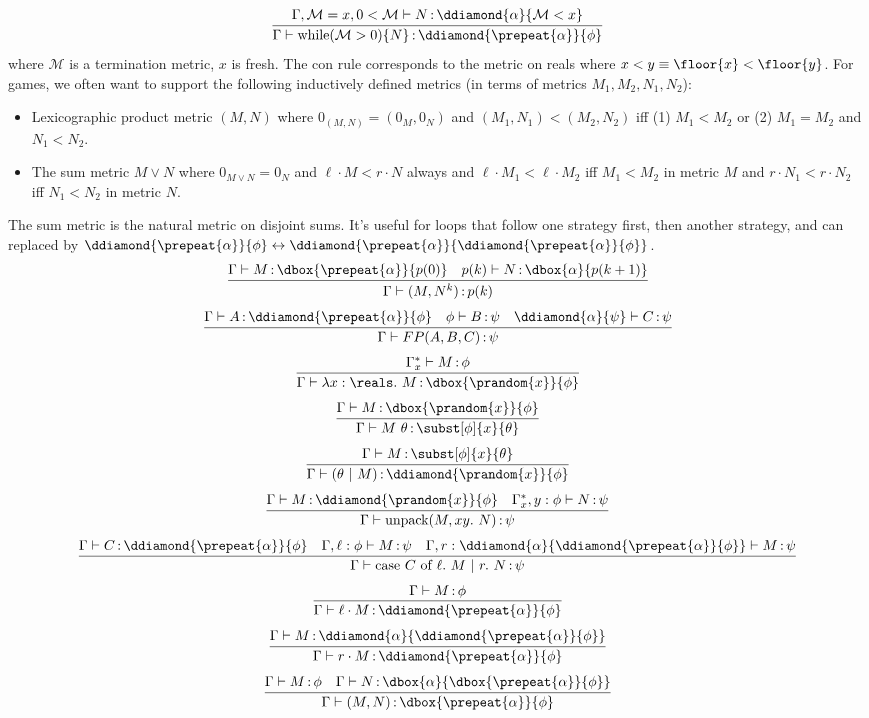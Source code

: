\documentclass[12pt]{cmuthesis}
\theoremstyle{definition}
\theoremstyle{remark}
\newcommand{\lequiv}{\leftrightarrow}
\begin{document}
\[\infer{\proves{\G}{\ewhile{\mathcal{M}}{N}}{\ddiamond{\prepeat{\alpha}}{\phi}}}
        {\proves{\G,\mathcal{M}=x,0<\mathcal{M}}{N}{\ddiamond{\alpha}{\mathcal{M}<x}}}\]
where $\mathcal{M}$ is a termination metric, $x$ is fresh.
The con rule corresponds to the metric on reals where $x < y \equiv \floor{x} < \floor{y}$.
For games, we often want to support the following inductively defined metrics (in terms of metrics $M_1, M_2, N_1, N_2$):
\begin{itemize}
\item Lexicographic product metric $(M,N)$ where $0_{(M,N)}=(0_M,0_N)$ and $(M_1,N_1) < (M_2,N_2)$ iff (1) $M_1 < M_2$ or (2) $M_1 = M_2$ and $N_1 < N_2$.
\item The sum metric $M \lor N$ where  $0_{M \lor N} = 0_N$ and $\ell\cdot M < r\cdot N$ always and $\ell\cdot M_1 <\ell \cdot M_2$ iff $M_1 < M_2$ in metric $M$ and $r\cdot N_1 < r\cdot N_2$ iff $N_1 < N_2$ in metric $N$.
\end{itemize}
The sum metric is the natural metric on disjoint sums.
It's useful for loops that follow one strategy first, then another strategy, and can replaced by $\ddiamond{\prepeat{\alpha}}{\phi} \lequiv \ddiamond{\prepeat{\alpha}}{\ddiamond{\prepeat{\alpha}}{\phi}}$.
\[\infer{\proves{\G}{\eloopelim{M}{N}{k}}{p(k)}}
        {\proves{\G}{M}{\dbox{\prepeat{\alpha}}{p(0)}}
        &\proves{p(k)}{N}{\dbox{\alpha}{p(k+1)}}}\]
\[\infer{\proves{\G}{\efp{A}{B}{C}}{\psi}}
        {\proves{\G}{A}{\ddiamond{\prepeat{\alpha}}{\phi}} & \proves{\phi}{B}{\psi} & \proves{\ddiamond{\alpha}{\psi}}{C}{\psi}}\]
\[\infer{\proves{\G}{\elam{\reals}{M}}{\dbox{\prandom{x}}{\phi}}}
        {\proves{\G_x^*}{M}{\phi}}\]
\[\infer{\proves{\G}{\eapp{M}{\theta}}{\subst[\phi]{x}{\theta}}}
        {\proves{\G}{M}{\dbox{\prandom{x}}{\phi}}}\]
\[\infer{\proves{\G}{\etcons{\theta}{M}}{\ddiamond{\prandom{x}}{\phi}}}
        {\proves{\G}{M}{\subst[\phi]{x}{\theta}}}\]
\[\infer{\proves{\G}{\eunpack{M}{N}}{\psi}}
        {\proves{\G}{M}{\ddiamond{\prandom{x}}{\phi}} & \proves{\G_x^*,y:\phi}{N}{\psi}}\]
\[\infer{\proves{\G}{\ecase{C}{M}{N}}{\psi}}
        {\proves{\G}{C}{\ddiamond{\prepeat{\alpha}}{\phi}}
        &\proves{\G,\ell:\phi}{M}{\psi}
        &\proves{\G,r:\ddiamond{\alpha}{\ddiamond{\prepeat{\alpha}}{\phi}}}{M}{\psi}}\]
\[\infer{\proves{\G}{\einjL{M}}{\ddiamond{\prepeat{\alpha}}{\phi}}}
        {\proves{\G}{M}{\phi}}\]
\[\infer{\proves{\G}{\einjR{M}}{\ddiamond{\prepeat{\alpha}}{\phi}}}
        {\proves{\G}{M}{\ddiamond{\alpha}{\ddiamond{\prepeat{\alpha}}{\phi}}}}\]
\[\infer{\proves{\G}{\econs{M}{N}}{\dbox{\prepeat{\alpha}}{\phi}}}
        {\proves{\G}{M}{\phi} & \proves{\G}{N}{\dbox{\alpha}{\dbox{\prepeat{\alpha}}{\phi}}}}\]
\end{document}
